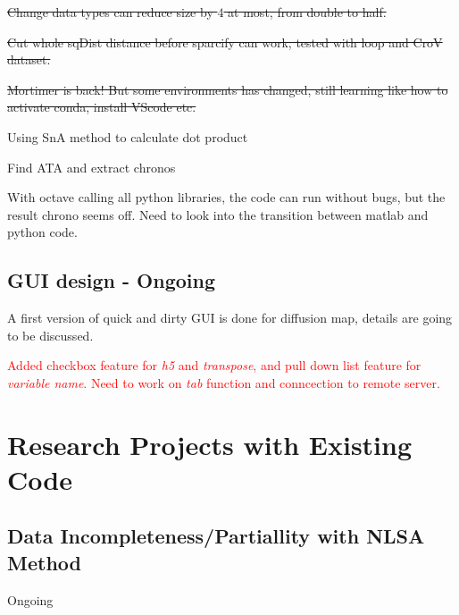 \documentclass{article}
\begin{document}
\st{Change data types can reduce size by $4$ at most, from double to half.}

\st{Cut whole sqDist distance before sparcify can work, tested with loop and CroV dataset.}

\st{Mortimer is back! But some environments has changed, still learning like how to activate conda, install VScode etc.}


\noindent Using SnA method to calculate dot product

\noindent Find ATA and extract chronos

\noindent With octave calling all python libraries, the code can run without bugs, but the result chrono seems off. Need to look into the transition between matlab and python code.

\subsection*{GUI design - Ongoing}
A first version of quick and dirty GUI is done for diffusion map, details are going to be discussed.

\noindent \textcolor{red}{Added checkbox feature for \textit{h5} and \textit{transpose}, and pull down list feature for \textit{variable name}. Need to work on \textit{tab} function and conncection to remote server.}
\section*{Research Projects with Existing Code}
\subsection*{Data Incompleteness/Partiallity with NLSA Method}
Ongoing
\end{document}
